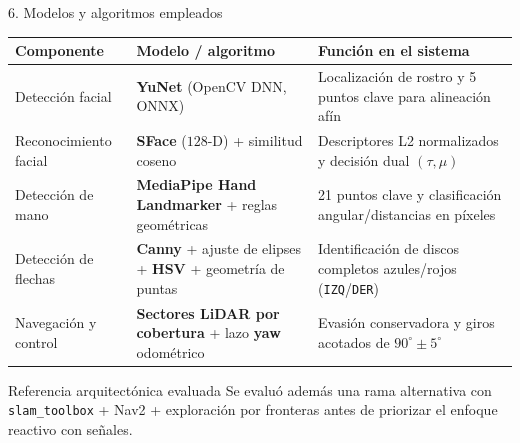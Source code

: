 \documentclass[aspectratio=169,10pt]{beamer}
\begin{document}
\begin{frame}{6. Modelos y algoritmos empleados}
  \footnotesize
  \begin{tabularx}{\textwidth}{@{}P{3.1cm}P{4.5cm}Y@{}}
    \hline
    \textbf{Componente} & \textbf{Modelo / algoritmo} & \textbf{Función en el sistema}\\
    \hline
    Detección facial &
    \textbf{YuNet} (OpenCV DNN, ONNX) &
    Localización de rostro y 5 puntos clave para alineación afín\\
    Reconocimiento facial &
    \textbf{SFace} ($128$-D) + similitud coseno &
    Descriptores L2 normalizados y decisión dual $(\tau,\mu)$\\
    Detección de mano &
    \textbf{MediaPipe Hand Landmarker} + reglas geométricas &
    21 puntos clave y clasificación angular/distancias en píxeles\\
    Detección de flechas &
    \textbf{Canny} + ajuste de elipses + \textbf{HSV} + geometría de puntas &
    Identificación de discos completos azules/rojos (\texttt{IZQ}/\texttt{DER})\\
    Navegación y control &
    \textbf{Sectores LiDAR por cobertura} + lazo \textbf{yaw} odométrico &
    Evasión conservadora y giros acotados de $90^\circ \pm 5^\circ$\\
    \hline
  \end{tabularx}
  \vspace{0.25em}
  \small
  \begin{block}{Referencia arquitectónica evaluada}
    Se evaluó además una rama alternativa con \texttt{slam\_toolbox} + Nav2 +
    exploración por fronteras antes de priorizar el enfoque reactivo con señales.
  \end{block}
\end{frame}
\end{document}
